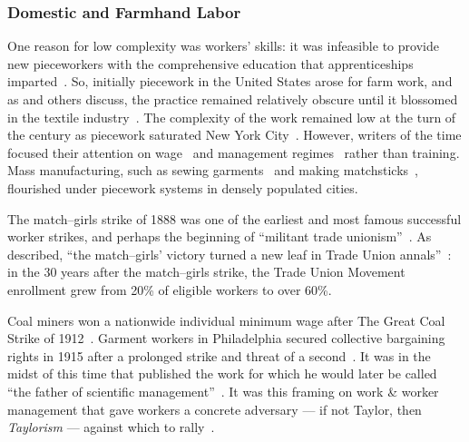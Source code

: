 \documentclass[trackingWork]{subfiles}
\begin{document}
\subsubsection{Domestic and Farmhand Labor}
One reason for low complexity was workers' skills:
it was infeasible to provide new pieceworkers with the comprehensive education
that apprenticeships imparted~\cite{hart2013rise}.
So, initially piecework in the United States arose for farm work, and as
\citeauthor{hughRaynbirdTaskWork} and others discuss,
the practice remained relatively obscure until
it blossomed in the textile industry~\cite{hughRaynbirdTaskWork}.
The complexity of the work remained low at the turn of
the  century as piecework saturated New York City~\cite{riisOtherSideLives}.
However, writers of the time focused their attention on
wage~\cite{burton1899commercial} and
management regimes~\cite{norton1900textile}
rather than training.
Mass manufacturing,
such as sewing garments~\cite{riisOtherSideLives} and making matchsticks~\cite{10.2307/3827491},
flourished under piecework systems in densely populated cities.

The match--girls strike of 1888 was one of the earliest and most famous successful worker strikes,
and perhaps the beginning of ``militant trade unionism''~\cite{10.2307/3827491}.
As \citeauthor{weyer1894history} described,
``the match--girls' victory turned a new leaf in Trade Union annals''~\cite{weyer1894history}: in the 30 years after the match--girls strike,
the Trade Union Movement enrollment grew from 20\% of eligible workers to over 60\%.

Coal miners won a nationwide individual minimum wage after The Great Coal Strike of 1912~\cite{10.2307/2221944}.
Garment workers in Philadelphia secured collective bargaining rights in 1915 after a prolonged strike and threat of a second~\cite{10.2307/41829256}.
It was in the midst of this time that \citeauthor{taylor1914principles} published
the work for which he would later be called ``the father of scientific management''~\cite{RePEc:mtp:titles:0262612062}.
It was this framing on work \& worker management that gave workers a concrete adversary
--- if not Taylor, then \textit{Taylorism}  ---
against which to rally~\cite{jacoby1983union,parker1920casual}.
\end{document}
